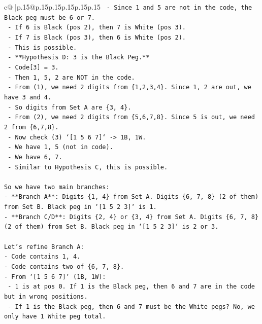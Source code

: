\documentclass{article}
\begin{document}
{\begin{supertabular}{c@{$\;$}|p{.15\linewidth}@{}p{.15\linewidth}p{.15\linewidth}p{.15\linewidth}p{.15\linewidth}p{.15\linewidth}}
{{{\texttt{            {-}   Since 1 and 5 are not in the code, the Black peg must be 6 or 7.} \\
\texttt{            {-}   If 6 is Black (pos 2), then 7 is White (pos 3).} \\
\texttt{            {-}   If 7 is Black (pos 3), then 6 is White (pos 2).} \\
\texttt{            {-}   This is possible.} \\
\texttt{    {-}   **Hypothesis D: 3 is the Black Peg.**} \\
\texttt{        {-}   Code{[}3{]} = 3.} \\
\texttt{        {-}   Then 1, 5, 2 are NOT in the code.} \\
\texttt{        {-}   From (1), we need 2 digits from \{1,2,3,4\}. Since 1, 2 are out, we have 3 and 4.} \\
\texttt{        {-}   So digits from Set A are \{3, 4\}.} \\
\texttt{        {-}   From (2), we need 2 digits from \{5,6,7,8\}. Since 5 is out, we need 2 from \{6,7,8\}.} \\
\texttt{        {-}   Now check (3) `{[}1 5 6 7{]}` {-}> 1B, 1W.} \\
\texttt{            {-}   We have 1, 5 (not in code).} \\
\texttt{            {-}   We have 6, 7.} \\
\texttt{            {-}   Similar to Hypothesis C, this is possible.} \\
\\ 
\texttt{So we have two main branches:} \\
\texttt{{-}   **Branch A**: Digits \{1, 4\} from Set A. Digits \{6, 7, 8\} (2 of them) from Set B. Black peg in `{[}1 5 2 3{]}` is 1.} \\
\texttt{{-}   **Branch C/D**: Digits \{2, 4\} or \{3, 4\} from Set A. Digits \{6, 7, 8\} (2 of them) from Set B. Black peg in `{[}1 5 2 3{]}` is 2 or 3.} \\
\\ 
\texttt{Let's refine Branch A:} \\
\texttt{{-}   Code contains 1, 4.} \\
\texttt{{-}   Code contains two of \{6, 7, 8\}.} \\
\texttt{{-}   From `{[}1 5 6 7{]}` (1B, 1W):} \\
\texttt{    {-}   1 is at pos 0. If 1 is the Black peg, then 6 and 7 are in the code but in wrong positions.} \\
\texttt{    {-}   If 1 is the Black peg, then 6 and 7 must be the White pegs? No, we only have 1 White peg total.} \\
}}}
\end{supertabular}}
\end{document}
